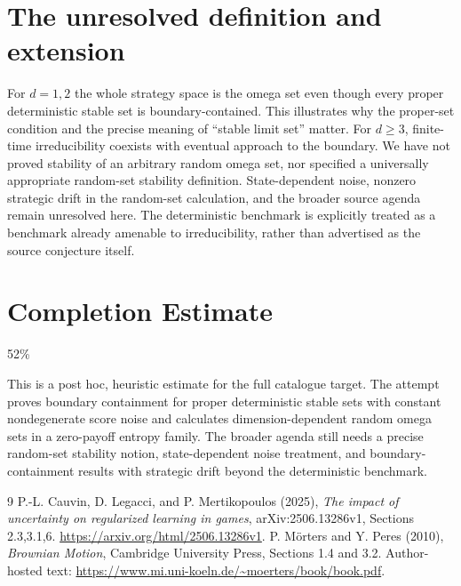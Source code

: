 \documentclass[11pt]{article}
\theoremstyle{definition}
\begin{document}
\section*{The unresolved definition and extension}
For $d=1,2$ the whole strategy space is the omega set even though
every proper deterministic stable set is boundary-contained. This
illustrates why the proper-set condition and the precise meaning of
``stable limit set'' matter. For $d\ge3$, finite-time irreducibility
coexists with eventual approach to the boundary. We have not proved
stability of an arbitrary random omega set, nor specified a universally
appropriate random-set stability definition. State-dependent noise,
nonzero strategic drift in the random-set calculation, and the broader
source agenda remain unresolved here. The deterministic benchmark is
explicitly treated as a benchmark already amenable to irreducibility,
rather than advertised as the source conjecture itself.

\section{Completion Estimate}
52\%

This is a post hoc, heuristic estimate for the full catalogue target.
The attempt proves boundary containment for proper deterministic stable sets with constant nondegenerate score noise and calculates dimension-dependent random omega sets in a zero-payoff entropy family. The broader agenda still needs a precise random-set stability notion, state-dependent noise treatment, and boundary-containment results with strategic drift beyond the deterministic benchmark.

\begin{thebibliography}{9}
 P.-L. Cauvin, D. Legacci, and P. Mertikopoulos (2025),
\emph{The impact of uncertainty on regularized learning in games},
arXiv:2506.13286v1, Sections 2.3,3.1,6.
\url{https://arxiv.org/html/2506.13286v1}.
 P. M\"orters and Y. Peres (2010), \emph{Brownian Motion},
Cambridge University Press, Sections 1.4 and 3.2. Author-hosted text:
\url{https://www.mi.uni-koeln.de/~moerters/book/book.pdf}.
\end{thebibliography}
\end{document}
